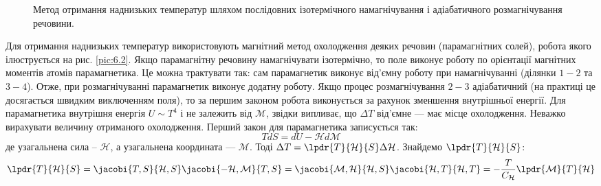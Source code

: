 
\begin{figure}[!h]
	\centering
	\begin{subfigure}[l]{0.445\textwidth}
        
		\caption{}
		\label{pic:6.1a}
	\end{subfigure}
	\begin{subfigure}[r]{0.475\textwidth}
        
		\caption{}
		\label{pic:6.1b}
	\end{subfigure}
	\caption{Метод отримання наднизьких температур шляхом послідовних ізотермічного намагнічування і адіабатичного розмагнічування речовини.}
	\label{pic:magnetization}
\end{figure}

Для отримання наднизьких температур використовують магнітний метод охолодження деяких речовин (парамагнітних солей), робота якого ілюструється на рис. \ref{pic:6.2}. Якщо парамагнітну речовину намагнічувати ізотермічно, то поле виконує роботу по орієнтації магнітних моментів атомів парамагнетика. Це можна трактувати так: сам парамагнетик виконує від'ємну роботу при намагнічуванні (ділянки $1-2$ та $3-4$). Отже, при розмагнічуванні парамагнетик виконує додатну роботу. Якщо процес розмагнічування $2-3$ адіабатичний (на практиці це досягається швидким виключенням поля), то за першим законом робота виконується за рахунок зменшення внутрішньої енергії. Для парамагнетика внутрішня енергія $U\sim T^{4}$ і не залежить від $\mathcal{M}$, звідки випливає, що $\Delta T$ від'ємне --- має місце охолодження. Неважко вирахувати величину отриманого охолодження. Перший закон для парамагнетика записується так:
\begin{equation}\label{6.9}
	TdS = dU - \mathcal{H}d\mathcal{M}
\end{equation}
де узагальнена сила – $\mathcal{H}$, а узагальнена координата --- $\mathcal{M}$. Тоді $\Delta T = \lpdr{T}{\mathcal{H}}{S}\Delta \mathcal{H}$. Знайдемо $\lpdr{T}{\mathcal{H}}{S}$:
\begin{equation}\label{6.10}
	\lpdr{T}{\mathcal{H}}{S} = \jacobi{T,S}{\mathcal{H},S}\jacobi{-\mathcal{H},\mathcal{M}}{T,S} = \jacobi{\mathcal{M},\mathcal{H}}{\mathcal{H},S}\jacobi{\mathcal{H},T}{\mathcal{H},T}=-\dfrac{T}{C_{\mathcal{H}}}\lpdr{\mathcal{M}}{T}{\mathcal{H}}
\end{equation}

